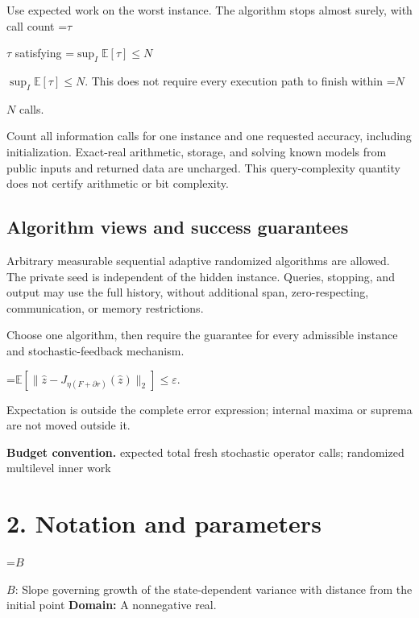 \documentclass[10pt,a4paper]{article}
\newcommand{\AtlasMath}[1]{\par\begingroup\centering\setbox0=\hbox{$\displaystyle #1$}\ifdim\wd0>1.4\linewidth\typeout{ATLAS WIDE FORMULA: \the\wd0}\fi\ifdim\wd0>\linewidth\resizebox{\linewidth}{!}{\box0}\else\box0\fi\par\endgroup}
\newcommand{\AtlasInlineMath}[1]{\begingroup\setbox0=\hbox{$#1$}\ifdim\wd0>.4\linewidth\endgroup\AtlasMath{#1}\else\endgroup$#1$\fi}
\begin{document}
Use expected work on the worst instance. The algorithm stops almost surely, with call count \AtlasInlineMath{\tau} satisfying \AtlasInlineMath{\sup_I\mathbb{E}[\tau]\le N}. This does not require every execution path to finish within \AtlasInlineMath{N} calls.



Count all information calls for one instance and one requested accuracy, including initialization. Exact-real arithmetic, storage, and solving known models from public inputs and returned data are uncharged. This query-complexity quantity does not certify arithmetic or bit complexity.



\subsection{Algorithm views and success guarantees}


Arbitrary measurable sequential adaptive randomized algorithms are allowed. The private seed is independent of the hidden instance. Queries, stopping, and output may use the full history, without additional span, zero-respecting, communication, or memory restrictions.



Choose one algorithm, then require the guarantee for every admissible instance and stochastic-feedback mechanism.




\AtlasMath{\mathbb{E}\!\left[\|\widehat{z}-J_{\eta(F+\partial r)}(\widehat{z})\|_2\right]\le\varepsilon.}




Expectation is outside the complete error expression; internal maxima or suprema are not moved outside it.



\textbf{Budget convention.} expected total fresh stochastic operator calls; randomized multilevel inner work



\section{2. Notation and parameters}


\AtlasInlineMath{B}: Slope governing growth of the state-dependent variance with distance from the initial point \textbf{Domain:} A nonnegative real.
\end{document}
